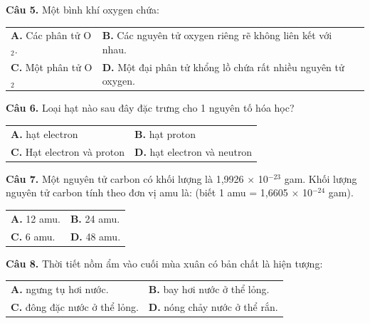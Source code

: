 \documentclass{article}
\begin{document}
\newpage

\fontsize{26}{34}\selectfont

\textbf{Câu 5.} Một bình khí oxygen chứa:
\vspace{6pt}

\begin{tabularx}{\linewidth}{@{}X X@{}}
\textbf{A.} Các phân tử O$_{2}$. & \textbf{B.} Các nguyên tử oxygen riêng rẽ không liên kết với nhau.\\[8pt]
\textbf{C.} Một phân tử O$_{2}$ & \textbf{D.} Một đại phân tử khổng lồ chứa rất nhiều nguyên tử oxygen.
\end{tabularx}

\vspace*{\fill}

\textbf{Câu 6.} Loại hạt nào sau đây đặc trưng cho 1 nguyên tố hóa học?
\vspace{6pt}

\begin{tabularx}{\linewidth}{@{}X X@{}}
\textbf{A.} hạt electron & \textbf{B.} hạt proton\\[8pt]
\textbf{C.} Hạt electron và proton & \textbf{D.} hạt electron và neutron
\end{tabularx}

\newpage

\fontsize{26}{34}\selectfont

\textbf{Câu 7.} Một nguyên tử carbon có khối lượng là 1,9926 $\times$  10$^{-23}$ gam. Khối lượng nguyên tử carbon tính theo đơn vị amu là: (biết 1 amu = 1,6605 $\times$  10$^{-24}$ gam).
\vspace{6pt}

\begin{tabularx}{\linewidth}{@{}X X@{}}
\textbf{A.} 12 amu. & \textbf{B.} 24 amu.\\[8pt]
\textbf{C.} 6 amu. & \textbf{D.} 48 amu.
\end{tabularx}

\vspace*{\fill}

\textbf{Câu 8.} Thời tiết nồm ẩm vào cuối mùa xuân có bản chất là hiện tượng:
\vspace{6pt}

\begin{tabularx}{\linewidth}{@{}X X@{}}
\textbf{A.} ngưng tụ hơi nước. & \textbf{B.} bay hơi nước ở thể lỏng.\\[8pt]
\textbf{C.} đông đặc nước ở thể lỏng. & \textbf{D.} nóng chảy nước ở thể rắn.
\end{tabularx}
\end{document}
